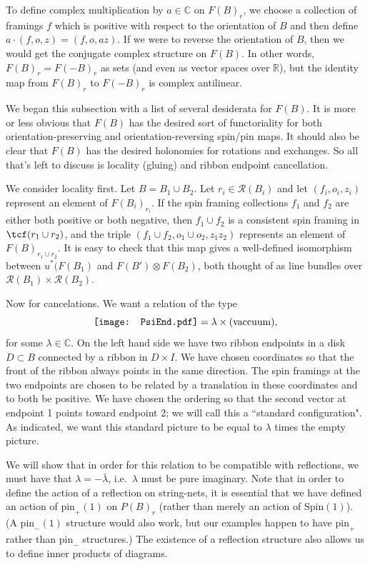 \documentclass[12pt,a4paper]{article}
\newcommand{\cc}{\mathbb{C}}
\newcommand{\rr}{\mathbb{R}}
\newcommand{\mcr}{\mathcal{R}}
\newcommand\be            {\begin{equation}}
\newcommand\ee            {\end{equation}}
\newcommand{\spin}{\text{Spin}}
\newcommand{\pin}{\text{pin}}
\newcommand{\PsiEnd}{\mathord{\vcenter{\hbox{\texttt{[image: PsiEnd.pdf]}}}}}
\begin{document}
To define complex multiplication by $a\in\cc$ on $F(B)_r$, we choose a collection of framings $f$ which is positive
with respect to the orientation of $B$ and then define $a\cdot (f, o, z) = (f, o, az)$.
If we were to reverse the orientation of $B$, then we would get the conjugate complex structure on $F(B)$.
In other words, $F(B)_r = F(-B)_r$ as sets (and even as vector spaces over $\rr$), but the identity map from
$F(B)_r$ to $F(-B)_r$ is complex antilinear.

\medskip

We began this subsection with a list of several desiderata for $F(B)$.
It is more or less obvious that $F(B)$ has the desired sort of functoriality for both orientation-preserving
and orientation-reversing spin/pin maps.
It should also be clear that $F(B)$ has the desired holonomies for rotations and exchanges.
So all that's left to discuss is locality (gluing) and ribbon endpoint cancellation.

\medskip

We consider locality first.
Let $B = B_1 \cup B_2$.
Let $r_i \in \mcr(B_i)$ and let $(f_i, o_i, z_i)$ represent an element of $F(B_i)_{r_i}$.
If the spin framing collections $f_1$ and $f_2$ are either both positive or both negative, then
$f_1 \cup f_2$ is a consistent spin framing in $\tcf(r_1 \cup r_2)$, and the triple
$(f_1 \cup f_2, o_1\cup o_2, z_1 z_2)$ represents an element of $F(B)_{r_1\cup r_2}$.
It is easy to check that this map gives a well-defined  isomorphism between $u^*(F(B_1)$ 
and $F(B')\otimes F(B_2)$, both thought of as line bundles over $\mcr(B_1)\times\mcr(B_2)$.

\medskip

Now for cancelations.
We want a relation of the type 
\be \label{eval_psi_semicirc}
\PsiEnd  = \lambda \times \text{(vaccuum)},
 \ee
for some $\lambda \in \cc$. 
On the left hand side we have two ribbon endpoints in a disk $D \subset B$ connected by a ribbon in $D\times I$.
We have chosen coordinates so that the front of the ribbon always points in the same direction.
The spin framings at the two endpoints are chosen to be related by a translation in these coordinates
and to both be positive.
We have chosen the ordering so that the second vector at endpoint 1 points toward endpoint 2;
we will call this a ``standard configuration".
As indicated, we want this standard picture to be equal to $\lambda$ times the empty picture.

We will show that in order for this relation to be compatible with reflections, 
we must have that $\lambda = -\bar\lambda$, i.e.\ $\lambda$ must be pure imaginary.
Note that in order to define the action of a reflection on string-nets, it is essential that we have defined an 
action of $\pin_+(1)$ on $P(B)_r$ (rather than merely an action of $\spin(1)$). 
(A $\pin_-(1)$ structure would also work, but our examples happen to have $\pin_+$ rather than $\pin_-$ structures.)
The existence of a reflection structure also allows us to define inner products of diagrams. 
\end{document}
